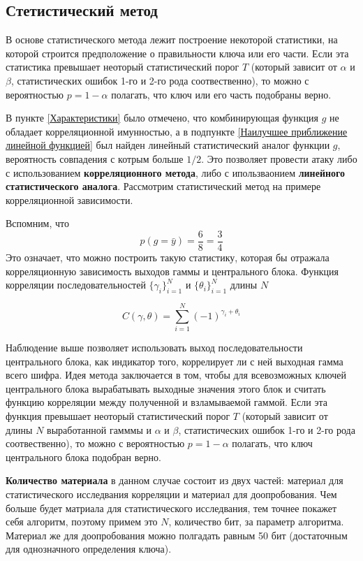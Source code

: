 \documentclass[a4paper,12pt]{article}
\theoremstyle{definition}
\begin{document}
	\subsection{Стетистический метод}
	
	В основе статистического метода лежит построение некоторой статистики, на которой строится предположение о правильности ключа или его части. Если эта статистика превышает неоторый статистический порог $T$ (который зависит от $\alpha$ и $\beta$, статистических ошибок 1-го и 2-го рода соотвественно), то можно с вероятностью $p=1-\alpha$ полагать, что ключ или его часть подобраны верно.
	
	В пункте \ref{Характеристики} было отмечено, что комбинирующая функция $g$ не обладает корреляционной имунностью, а в подпункте \ref{Наилучшее приближение линейной функцией} был найден линейный статистический аналог функции $g$, вероятность совпадения с котрым больше $1/2$. Это позволяет провести атаку либо с использованием \textbf{корреляционного метода}, либо с ипользваонием \textbf{линейного статистического аналога}. Рассмотрим статистический метод на примере корреляционной зависимости.
	
	Вспомним, что 
	\[ p(g= \bar{y}) = \frac{6}{8} = \frac{3}{4} \]
	Это означает, что можно построить такую статистику, которая бы отражала корреляционную зависимость выходов гаммы и центрального блока. Функция корреляции последовательностей $\{\gamma_i\}_{i=1}^N$ и $\{\theta_i\}_{i=1}^N$ длины $N$
	
	\[  C(\gamma, \theta) = \sum_{i=1}^{N} \left(-1\right)^{\gamma_i +\theta_i} \]
	
	Наблюдение выше позволяет использовать выход последовательности центрального блока, как индикатор того, коррелирует ли с ней выходная гамма всего шифра. Идея метода заключается в том, чтобы для всевозможных ключей центрального блока вырабатывать выходные значения этого блок и считать функцию корреляции между полученной и взламываемой гаммой. Если эта функция превышает неоторый статистический порог $T$ (который зависит от длины $N$ выработанной гамммы и $\alpha$ и $\beta$, статистических ошибок 1-го и 2-го рода соотвественно), то можно с вероятностью $p=1-\alpha$ полагать, что ключ центрального блока подобран верно.

	\textbf{Количество материала} в данном случае состоит из двух частей: материал для статистического исследвания корреляции и материал для доопробования. Чем больше будет матриала для статистического исследвания, тем точнее покажет себя алгоритм, поэтому примем это $N$, количество бит, за параметр алгоритма. Материал же для доопробования можно полгадать равным 50 бит (достаточным для однозначного определения ключа).
	
\end{document}
